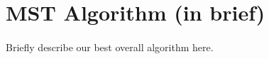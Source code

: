 \section{MST Algorithm (in brief)}
\label{sec:algbrief}

\paragraph{}
Briefly describe our best overall algorithm here.
